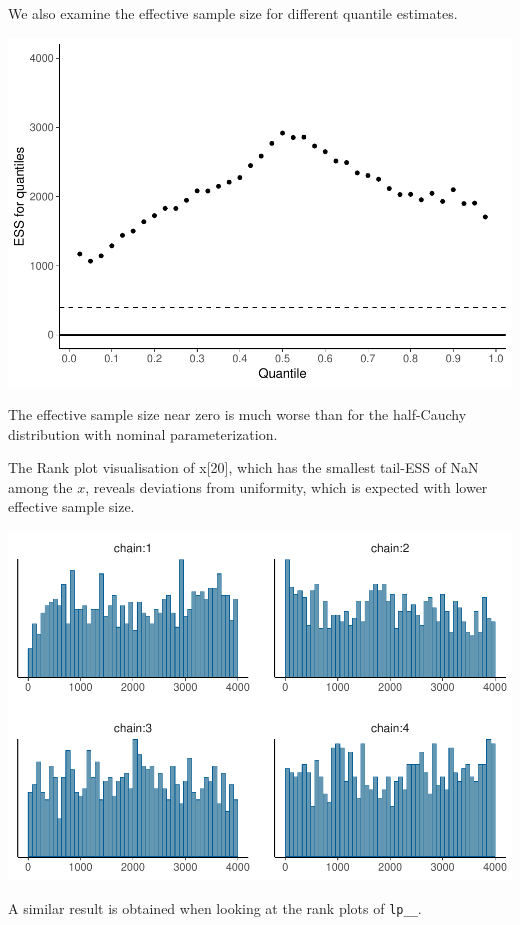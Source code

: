 \documentclass[american,]{article}
\begin{document}
We also examine the effective sample size for different quantile
estimates.

\includegraphics{graphics/quantile-ess-fit-half-reparam-1.pdf}

The effective sample size near zero is much worse than for the
half-Cauchy distribution with nominal parameterization.

The Rank plot visualisation of x{[}20{]}, which has the smallest
tail-ESS of NaN among the \(x\), reveals deviations from uniformity,
which is expected with lower effective sample size.

\includegraphics{graphics/hist-fit-half-reparam-1.pdf}

A similar result is obtained when looking at the rank plots of
\texttt{lp\_\_}.
\end{document}
